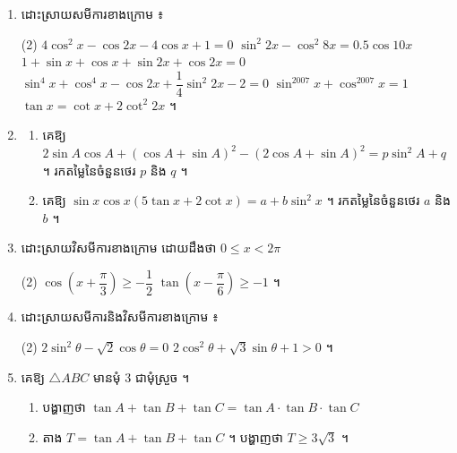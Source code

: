 \begin{enumerate}[1]
\begin{tasks}
  \end{tasks}
  \item ដោះស្រាយសមីការខាងក្រោម ៖
  \begin{tasks}(2)
    \task $4\cos^2 x - \cos 2x - 4\cos x + 1 = 0$
    \task $\sin^2 2x - \cos^2 8x = 0.5\cos 10x$
    \task $1 + \sin x + \cos x + \sin 2x + \cos 2x = 0$
    \task $\sin^4 x + \cos^4 x - \cos 2x + \dfrac{1}{4}\sin^2 2x - 2 = 0$
    \task $\sin^{2007} x + \cos^{2007} x = 1$
    \task $\tan x = \cot x + 2\cot^2 2x$ ។
  \end{tasks}
  \item
  \begin{enumerate}[a]
    \item គេឱ្យ $2\sin A\cos A + (\cos A + \sin A)^2 - (2\cos A + \sin A)^2 = p\sin^2 A + q$ ។ រកតម្លៃនៃចំនួនថេរ $p$ និង $q$ ។
    \item គេឱ្យ $\sin x\cos x(5\tan x + 2\cot x) = a + b\sin^2 x$ ។ រកតម្លៃនៃចំនួនថេរ $a$ និង $b$ ។
  \end{enumerate}
  \item ដោះស្រាយវិសមីការខាងក្រោម ដោយដឹងថា $0 \le x < 2\pi$
  \begin{tasks}(2)
    \task $\cos\left(x + \dfrac{\pi}{3}\right) \ge -\dfrac{1}{2}$
    \task $\tan\left(x - \dfrac{\pi}{6}\right) \ge -1$ ។
  \end{tasks}
  \item ដោះស្រាយសមីការនិងវិសមីការខាងក្រោម ៖
  \begin{tasks}(2)
    \task $2\sin^2\theta - \sqrt{2}\cos\theta = 0$
    \task $2\cos^2\theta + \sqrt{3}\sin\theta + 1 > 0$ ។
  \end{tasks}
  \item គេឱ្យ $\triangle ABC$ មានមុំ $3$ ជាមុំស្រួច ។
  \begin{enumerate}[a]
    \item បង្ហាញថា $\tan A + \tan B + \tan C = \tan A \cdot \tan B \cdot \tan C$
    \item តាង $T = \tan A + \tan B + \tan C$ ។ បង្ហាញថា $T \ge 3\sqrt{3}$ ។
  \end{enumerate}
\end{enumerate}


